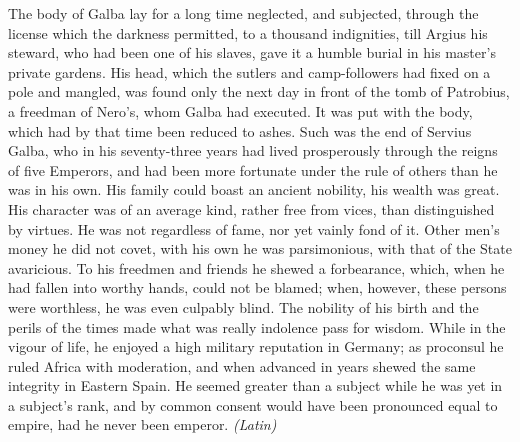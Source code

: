 
The body of Galba lay for a long time neglected, and subjected, through the license which the darkness permitted, to a thousand indignities, till Argius his steward, who had been one of his slaves, gave it a humble burial in his master's private gardens. His head, which the sutlers and camp-followers had fixed on a pole and mangled, was found only the next day in front of the tomb of Patrobius, a freedman of Nero's, whom Galba had executed. It was put with the body, which had by that time been reduced to ashes. Such was the end of Servius Galba, who in his seventy-three years had lived prosperously through the reigns of five Emperors, and had been more fortunate under the rule of others than he was in his own. His family could boast an ancient nobility, his wealth was great. His character was of an average kind, rather free from vices, than distinguished by virtues. He was not regardless of fame, nor yet vainly fond of it. Other men's money he did not covet, with his own he was parsimonious, with that of the State avaricious. To his freedmen and friends he shewed a forbearance, which, when he had fallen into worthy hands, could not be blamed; when, however, these persons were worthless, he was even culpably blind. The nobility of his birth and the perils of the times made what was really indolence pass for wisdom. While in the vigour of life, he enjoyed a high military reputation in Germany; as proconsul he ruled Africa with moderation, and when advanced in years shewed the same integrity in Eastern Spain. He seemed greater than a subject while he was yet in a subject's rank, and by common consent would have been pronounced equal to empire, had he never been emperor. \emph{(Latin)}



